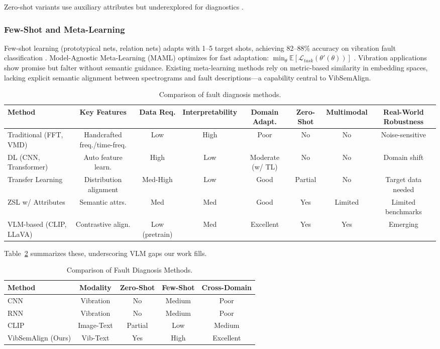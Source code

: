 Zero-shot variants use auxiliary attributes but underexplored for diagnostics \cite{chen2023gzsl}.

\subsubsection{Few-Shot and Meta-Learning}
Few-shot learning (prototypical nets, relation nets) adapts with 1--5 target shots, achieving 82--88\% accuracy on vibration fault classification \cite{hoang2023vit}. Model-Agnostic Meta-Learning (MAML) optimizes for fast adaptation: $\min_\theta \mathbb{E} [\mathcal{L}_{task}(\theta'(\theta))]$ \cite{wen2022maml}. Vibration applications show promise but falter without semantic guidance. Existing meta-learning methods rely on metric-based similarity in embedding spaces, lacking explicit semantic alignment between spectrograms and fault descriptions---a capability central to VibSemAlign.

\begin{table}[t]
\centering
\caption{Comparison of fault diagnosis methods.}
\label{tab:comparison}
\begin{tabular}{@{}lccccccc@{}}
\toprule
Method & Key Features & Data Req. & Interpretability & Domain Adapt. & Zero-Shot & Multimodal & Real-World Robustness \\
\midrule
Traditional (FFT, VMD) & Handcrafted freq./time-freq. & Low & High & Poor & No & No & Noise-sensitive \\
DL (CNN, Transformer) & Auto feature learn. & High & Low & Moderate (w/ TL) & No & No & Domain shift \\
Transfer Learning & Distribution alignment & Med-High & Low & Good & Partial & No & Target data needed \\
ZSL w/ Attributes & Semantic attrs. & Med & Med & Good & Yes & Limited & Limited benchmarks \\
VLM-based (CLIP, LLaVA) & Contrastive align. & Low (pretrain) & Med & Excellent & Yes & Yes & Emerging \\
\bottomrule
\end{tabular}
\end{table}

Table~\ref{tab:I} summarizes these, underscoring VLM gaps our work fills.
\begin{table}[t]
\centering
\caption{Comparison of Fault Diagnosis Methods.}
\label{tab:I}
\begin{tabular}{@{}lcccc@{}}
\toprule
Method & Modality & Zero-Shot & Few-Shot & Cross-Domain \\
\midrule
CNN & Vibration & No & Medium & Poor \\
RNN & Vibration & No & Medium & Poor \\
CLIP & Image-Text & Partial & Low & Medium \\
VibSemAlign (Ours) & Vib-Text & Yes & High & Excellent \\
\bottomrule
\end{tabular}
\end{table}
